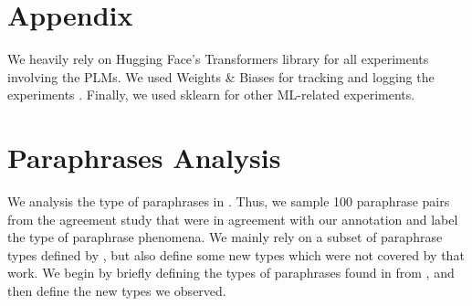 \section{Appendix}
\label{sec:appendix}

We heavily rely on Hugging Face's Transformers library \cite{wolf-etal-2020-transformers} for all experiments involving the PLMs.
We used Weights \& Biases for tracking and logging the experiments \cite{wandb}.
Finally, we used sklearn \cite{scikit-learn} for other ML-related experiments.

% 

\section{Paraphrases Analysis}
\label{sec:paraphrase_analysis}

We analysis the type of paraphrases in \resource{}. Thus, we sample 100 paraphrase pairs from the agreement study that were in agreement with our annotation and label the type of paraphrase phenomena.
We mainly rely on a subset of paraphrase types defined by \citet{what_is_paraphrase}, but also define some new types which were not covered by that work.
We begin by briefly defining the types of paraphrases found in \resource{} from \citet{what_is_paraphrase}, and then define the new types we observed.



